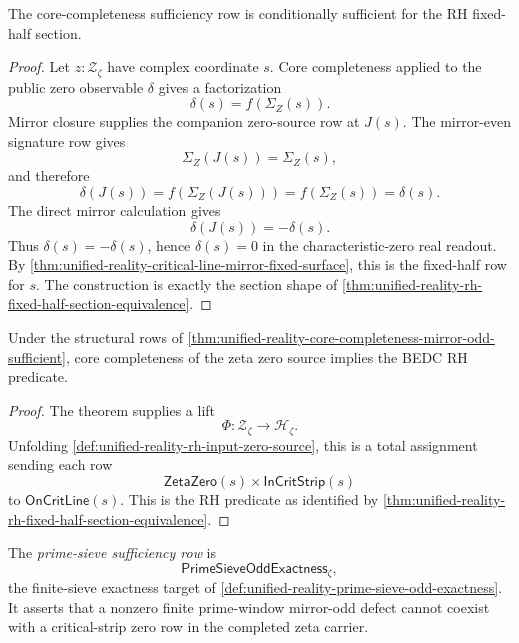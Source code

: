 \begin{theorem}
\label{thm:unified-reality-core-completeness-mirror-odd-sufficient}
The core-completeness sufficiency row is conditionally sufficient for the
RH fixed-half section.
\end{theorem}

\begin{proof}
Let $z:\mathcal Z_{\zeta}$ have complex coordinate $s$.  Core
completeness applied to the public zero observable $\delta$ gives a
factorization
$$
\delta(s)=f(\Sigma_Z(s)).
$$
Mirror closure supplies the companion zero-source row at $J(s)$.  The
mirror-even signature row gives
$$
\Sigma_Z(J(s))=\Sigma_Z(s),
$$
and therefore
$$
\delta(J(s))
=
f(\Sigma_Z(J(s)))
=
f(\Sigma_Z(s))
=
\delta(s).
$$
The direct mirror calculation gives
$$
\delta(J(s))=-\delta(s).
$$
Thus $\delta(s)=-\delta(s)$, hence $\delta(s)=0$ in the
characteristic-zero real readout.  By
\autoref{thm:unified-reality-critical-line-mirror-fixed-surface}, this is
the fixed-half row for $s$.  The construction is exactly the section
shape of
\autoref{thm:unified-reality-rh-fixed-half-section-equivalence}.
\end{proof}

\begin{corollary}
\label{cor:unified-reality-core-completeness-conditionally-rh}
Under the structural rows of
\autoref{thm:unified-reality-core-completeness-mirror-odd-sufficient},
core completeness of the zeta zero source implies the BEDC RH predicate.
\end{corollary}

\begin{proof}
The theorem supplies a lift
$$
\Phi:
\mathcal Z_{\zeta}\to\mathcal H_{\zeta}.
$$
Unfolding \autoref{def:unified-reality-rh-input-zero-source}, this is a
total assignment sending each row
$$
\mathsf{ZetaZero}(s)\times\mathsf{InCritStrip}(s)
$$
to $\mathsf{OnCritLine}(s)$.  This is the RH predicate as identified by
\autoref{thm:unified-reality-rh-fixed-half-section-equivalence}.
\end{proof}

\begin{definition}
\label{def:unified-reality-prime-sieve-sufficiency-row}
The \emph{prime-sieve sufficiency row} is
$$
\mathsf{PrimeSieveOddExactness}_{\zeta},
$$
the finite-sieve exactness target of
\autoref{def:unified-reality-prime-sieve-odd-exactness}.  It asserts that
a nonzero finite prime-window mirror-odd defect cannot coexist with a
critical-strip zero row in the completed zeta carrier.
\end{definition}

